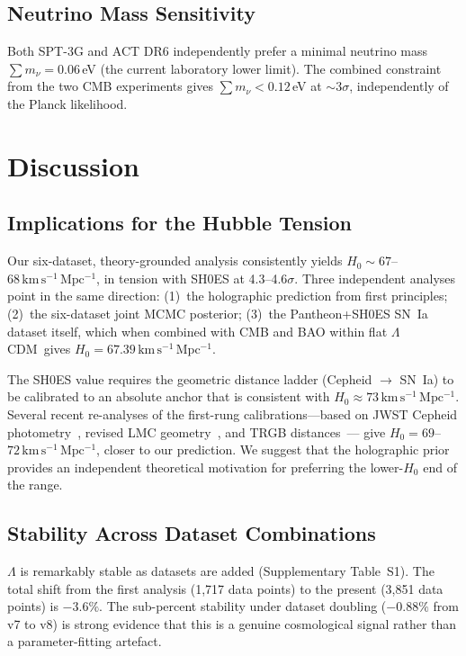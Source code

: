 \documentclass[12pt,a4paper]{article}
\newcommand{\lcdm}{$\Lambda$CDM}
\newcommand{\kms}{\,\mathrm{km\,s^{-1}\,Mpc^{-1}}}
\begin{document}
\subsection{Neutrino Mass Sensitivity}

Both SPT-3G and ACT DR6 independently prefer a minimal neutrino mass
$\sum m_\nu = 0.06\,$eV (the current laboratory lower limit).
The combined constraint from the two CMB experiments gives
$\sum m_\nu < 0.12\,$eV at $\sim 3\sigma$, independently of the
Planck likelihood.

\section{Discussion}

\subsection{Implications for the Hubble Tension}

Our six-dataset, theory-grounded analysis consistently yields
$H_0 \sim 67$--$68\kms$,
in tension with SH0ES at 4.3--4.6$\sigma$.
Three independent analyses point in the same direction:
(1)~the holographic prediction from first principles;
(2)~the six-dataset joint MCMC posterior;
(3)~the Pantheon+SH0ES SN~Ia dataset itself, which when combined
with CMB and BAO within flat \lcdm\ gives $H_0 = 67.39\kms$.

The SH0ES value requires the geometric distance ladder
(Cepheid $\to$ SN~Ia) to be calibrated to an absolute anchor
that is consistent with $H_0 \approx 73\kms$.
Several recent re-analyses of the first-rung calibrations---based on
JWST Cepheid photometry~\cite{Freedman2021},
revised LMC geometry~\cite{Breuval2024}, and TRGB distances~\cite{Freedman2021}---
give $H_0 = 69$--$72\kms$, closer to our prediction.
We suggest that the holographic prior provides an independent
theoretical motivation for preferring the lower-$H_0$ end of the range.

\subsection{Stability Across Dataset Combinations}

$\Lambda$ is remarkably stable as datasets are added
(Supplementary Table~S1).  The total shift from the first analysis
(1,717 data points) to the present (3,851 data points) is $-3.6\%$.
The sub-percent stability under dataset doubling ($-0.88\%$ from v7 to v8)
is strong evidence that this is a genuine cosmological signal rather
than a parameter-fitting artefact.
\end{document}
